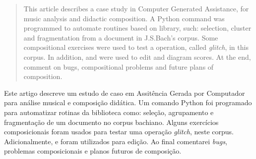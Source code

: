 \begin{abstract}
This article describes a case study in Computer Generated Assistance, for music analysis and didactic composition. A Python command was programmed to automate routines based on \cite{music21_2015} library, such: selection, cluster and fragmentation from a document in J.S.Bach's corpus. Some compositional exercises were used to test a operation, called \emph{glitch}, in this corpus. In addition, \cite{musescore_2015} and \cite{lilypond_2015} were used to edit and diagram scores. At the end, comment on bugs, compositional problems and future plans of composition.
\end{abstract}

\begin{resumo}
Este artigo descreve um estudo de caso em Assitência Gerada por Computador para análise musical e composição didática. Um comando {Python} foi programado para automatizar rotinas da biblioteca \cite{music21_2015} como: seleção, agrupamento e fragmentação de um documento no corpus bachiano. Alguns exercícios composicionais foram usados para testar uma operação \emph{glitch}, neste corpus. Adicionalmente,  \cite{musescore_2015} e \cite{lilypond_2015} foram utilizados para edição. Ao final comentarei \emph{bugs}, problemas composicionais  e planos futuros de composição.
\end{resumo}